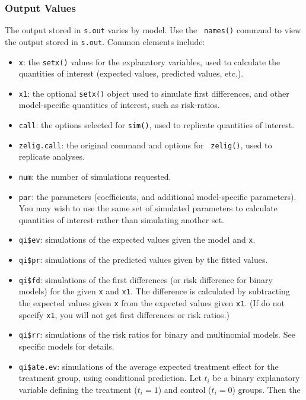 \subsubsection{Output Values}
The output stored in {\tt s.out} varies by model.  Use the {\tt
  names()} command to view the output stored in {\tt s.out}.  Common
elements include:
\begin{itemize}
  \item {\tt x}: the {\tt setx()} values for the explanatory variables,
    used to calculate the quantities of interest (expected values,
    predicted values, etc.).    
  \item {\tt x1}: the optional {\tt setx()} object used to simulate
    first differences, and other model-specific quantities of
    interest, such as risk-ratios.  
  \item {\tt call}: the options selected for {\tt sim()}, used to
    replicate quantities of interest.  
  \item {\tt zelig.call}: the original command and options for {\tt
      zelig()}, used to replicate analyses.
  \item {\tt num}: the number of simulations requested.  
  \item {\tt par}: the parameters (coefficients, and additional
    model-specific parameters).  You may wish to use the same set of
    simulated parameters to calculate quantities of interest rather
    than simulating another set.
  \item {\tt qi\$ev}: simulations of the expected values given the
    model and {\tt x}.
  \item {\tt qi\$pr}: simulations of the predicted values given by the
    fitted values.
  \item {\tt qi\$fd}: simulations of the first differences (or risk
    difference for binary models) for the given {\tt x} and {\tt x1}.
    The difference is calculated by subtracting the expected values
    given {\tt x} from the expected values given {\tt x1}.  (If do not
    specify {\tt x1}, you will not get first differences or risk
    ratios.)
  \item {\tt qi\$rr}: simulations of the risk ratios for binary and
    multinomial models.  See specific models for details.    
  \item {\tt qi\$ate.ev}: simulations of the average expected
    treatment effect for the treatment group, using conditional
    prediction. Let $t_i$ be a binary explanatory variable defining
    the treatment ($t_i=1$) and control ($t_i=0$) groups.  Then the

\end{itemize}
